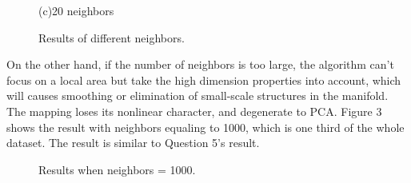 \documentclass[22pt]{article}
\begin{document}
\begin{figure}[H]
{\begin{minipage}{7cm}{(c)20 neighbors}
					\end{minipage}
				}
				\caption{Results of different neighbors.}
			\end{figure}

	On the other hand, if the number of neighbors is too large, the algorithm can't focus on a local area but take the high dimension properties into account, which will causes smoothing or elimination of small-scale structures in the manifold. The mapping loses its nonlinear character, and degenerate to PCA. Figure 3 shows the result with neighbors equaling to 1000, which is one third of the whole dataset. The result is similar to Question 5's result.
	\begin{figure}[H]
				\centering
				\caption{Results when neighbors = 1000.}
			\end{figure}
\end{document}
